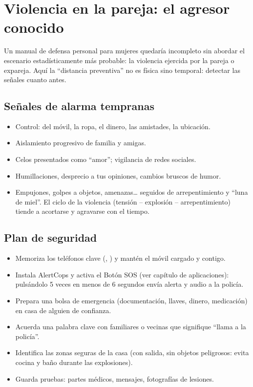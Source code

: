 \chapter{Violencia en la pareja: el agresor conocido}

Un manual de defensa personal para mujeres quedaría incompleto sin abordar el escenario estadísticamente más probable: la violencia ejercida por la pareja o expareja. Aquí la \enquote{distancia preventiva} no es física sino temporal: detectar las señales cuanto antes.

\section{Señales de alarma tempranas}

\begin{itemize}
  \item Control: del móvil, la ropa, el dinero, las amistades, la ubicación.
  \item Aislamiento progresivo de familia y amigas.
  \item Celos presentados como \enquote{amor}; vigilancia de redes sociales.
  \item Humillaciones, desprecio a tus opiniones, cambios bruscos de humor.
  \item Empujones, golpes a objetos, amenazas\ldots{} seguidos de arrepentimiento y \enquote{luna de miel}. El ciclo de la violencia (tensión -- explosión -- arrepentimiento) tiende a acortarse y agravarse con el tiempo.
\end{itemize}

\section{Plan de seguridad}

\begin{itemize}
  \item Memoriza los teléfonos clave (, ) y mantén el móvil cargado y contigo.
  \item Instala AlertCops y activa el Botón SOS (ver capítulo de aplicaciones): pulsándolo 5 veces en menos de 6 segundos envía alerta y audio a la policía.
  \item Prepara una bolsa de emergencia (documentación, llaves, dinero, medicación) en casa de alguien de confianza.
  \item Acuerda una palabra clave con familiares o vecinas que signifique \enquote{llama a la policía}.
  \item Identifica las zonas seguras de la casa (con salida, sin objetos peligrosos: evita cocina y baño durante las explosiones).
  \item Guarda pruebas: partes médicos, mensajes, fotografías de lesiones.
\end{itemize}

